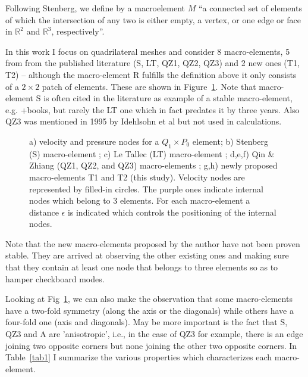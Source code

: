 \documentclass[a4paper]{article}
\begin{document}
Following Stenberg\cite{sten90}, we define by a macroelement $M$ ``a connected set of elements of which the 
intersection of any two is either empty, a vertex, or one edge or face in $\mathbb{R}^2$ 
and $\mathbb{R}^3$, respectively''.

In this work I focus on quadrilateral meshes and consider 8 
macro-elements, 5 from from the published literature (S, LT, QZ1, QZ2, QZ3) and 2 new ones (T1, T2) -- although 
the macro-element R fulfills the definition above it only consists of a $2\times 2$ patch of elements. 
These are shown in Figure~\ref{fig:mes}.
Note that macro-element S is often cited in the literature as example of a stable macro-element, 
e.g. \cite{chba93}+books, but rarely the LT one which in fact predates it by three years. 
Also QZ3 was mentioned in 1995 by Idehlsohn et al \cite{idsn95} but not used in calculations. 

\begin{figure}[t]

\caption{
a) velocity and pressure nodes for a $Q_1\times P_0$ element;
b) Stenberg (S) macro-element \cite{sten84}; 
c) Le Tallec (LT) macro-element \cite{leta81,leru86}; 
d,e,f) Qin \& Zhiang (QZ1, QZ2, and QZ3) macro-elements \cite{qizh07}; 
g,h) newly proposed macro-elements T1 and T2 (this study).
Velocity nodes are represented by filled-in circles. The purple ones indicate internal nodes which belong to 3 elements.
For each macro-element a distance $\epsilon$ is indicated which controls the positioning of the internal nodes.
\label{fig:mes}}
\end{figure}

Note that the new macro-elements proposed by the author have not been proven stable. They are arrived at 
observing the other existing ones and making sure that they contain at least one node that belongs to three 
elements so as to hamper checkboard modes.


Looking  at Fig~\ref{fig:mes}, we can also make the observation that some macro-elements 
have a two-fold symmetry (along the axis or the diagonals) while others have a four-fold one 
(axis and diagonals). May be more important is the fact that S, QZ3 and A are 'anisotropic', i.e., in 
the case of QZ3 for example, there is an edge joining two opposite corners but none joining the 
other two opposite corners.
In Table~\ref{tab1} I summarize the various properties which characterizes each macro-element.
\end{document}
